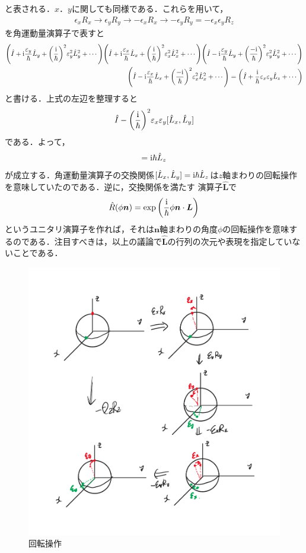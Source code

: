 \documentclass{report}
\begin{document}
  と表される．$x$．$y$に関しても同様である．これらを用いて，
  \begin{align}
    \epsilon_xR_x \to \epsilon_y R_y \to -\epsilon_x R_x \to -\epsilon_yR_y = -\epsilon_x\epsilon_y R_z
  \end{align}
  を角運動量演算子で表すと
  \begin{align}
    \qty(\hat{I} + \mathrm{i}\frac{\varepsilon_y}{\hbar}\hat{L}_y + \qty(\frac{\mathrm{i}}{\hbar})^2\varepsilon_y^2 \hat{L}_y^2 + \cdots) \qty(\hat{I} + \mathrm{i}\frac{\varepsilon_x}{\hbar}\hat{L}_x + \qty(\frac{\mathrm{i}}{\hbar})^2\varepsilon_x^2 \hat{L}_x^2 + \cdots) \qty(\hat{I} - \mathrm{i}\frac{\varepsilon_y}{\hbar}\hat{L}_y + \qty(\frac{-\mathrm{i}}{\hbar})^2\varepsilon_y^2 \hat{L}_y^2 + \cdots)\\ \qty(\hat{I} - \mathrm{i}\frac{\varepsilon_x}{\hbar}\hat{L}_x + \qty(\frac{-\mathrm{i}}{\hbar})^2\varepsilon_x^2 \hat{L}_x^2 + \cdots)
    =\qty(\hat{I} + \frac{\mathrm{i}}{\hbar}\varepsilon_x\varepsilon_y \hat{L}_z + \cdots)
  \end{align}
  と書ける．上式の左辺を整理すると
  \begin{align}
    \hat{I} - \qty(\frac{\mathrm{i}}{\hbar})^2\varepsilon_x\varepsilon_y[\hat{L}_x, \hat{L}_y]
  \end{align}
  である．よって，
  \begin{align}
    [\hat{L}_x, \hat{L}_y] = \i\hbar\hat{L}_z
  \end{align}
  が成立する．角運動量演算子の交換関係$[\hat{L}_x, \hat{L}_y] = \mathrm{i}\hbar\hat{L}_z$は$z$軸まわりの回転操作を意味していたのである．逆に，交換関係を満たす
  演算子$\hat{\bm{L}}$で
  \begin{align}
    \hat{R}(\phi\bm{n}) = \exp\qty(\frac{\mathrm{i}}{\hbar}\phi\bm{n}\cdot\bm{L})
  \end{align}
  というユニタリ演算子を作れば，それは$\bm{n}$軸まわりの角度$\phi$の回転操作を意味するのである．注目すべきは，以上の議論で$\hat{\bm{L}}$の行列の次元や表現を指定していないことである．

  \begin{figure}[H]
    \centering
    \includegraphics[width=0.8\columnwidth]{fig/rotation.pdf}
    \caption{回転操作}
    \label{rotation-image}
  \end{figure}
\end{document}
